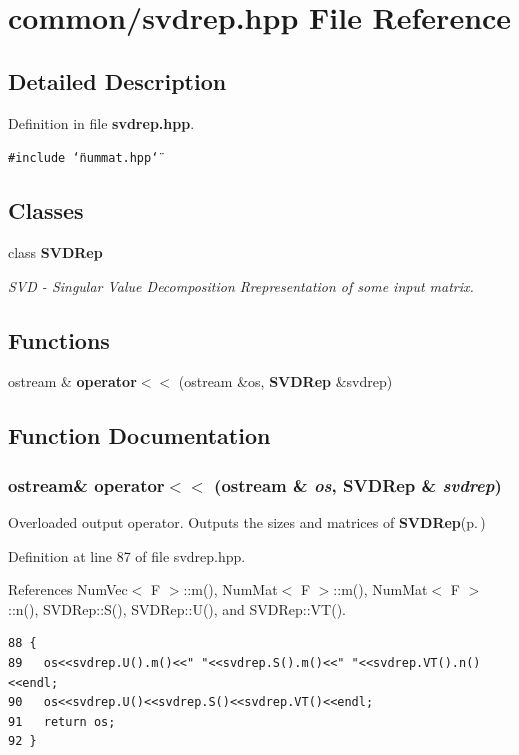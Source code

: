 \section{common/svdrep.hpp File Reference}
\label{svdrep_8hpp}


\subsection{Detailed Description}


Definition in file {\bf svdrep.hpp}.

{\tt \#include \char`\"{}nummat.hpp\char`\"{}}\par
\subsection*{Classes}
\begin{CompactItemize}
\item 
class {\bf SVDRep}
\begin{CompactList}\small\item\em SVD - Singular Value Decomposition Rrepresentation of some input matrix. \item\end{CompactList}\end{CompactItemize}
\subsection*{Functions}
\begin{CompactItemize}
\item 
ostream \& {\bf operator$<$$<$} (ostream \&os, {\bf SVDRep} \&svdrep)
\end{CompactItemize}


\subsection{Function Documentation}
\subsubsection{\setlength{\rightskip}{0pt plus 5cm}ostream\& operator$<$$<$ (ostream \& {\em os}, {\bf SVDRep} \& {\em svdrep})\hspace{0.3cm}{\tt  [inline]}}\label{svdrep_8hpp_bed1fbd2bbde8a74117d45ebe8d75c26_bed1fbd2bbde8a74117d45ebe8d75c26}


Overloaded output operator. Outputs the sizes and matrices of {\bf SVDRep}{\rm (p.\,\pageref{classSVDRep})} 

Definition at line 87 of file svdrep.hpp.

References Num\-Vec$<$ F $>$::m(), Num\-Mat$<$ F $>$::m(), Num\-Mat$<$ F $>$::n(), SVDRep::S(), SVDRep::U(), and SVDRep::VT().

\footnotesize\begin{verbatim}88 {
89   os<<svdrep.U().m()<<" "<<svdrep.S().m()<<" "<<svdrep.VT().n()<<endl;
90   os<<svdrep.U()<<svdrep.S()<<svdrep.VT()<<endl;
91   return os;
92 }
\end{verbatim}\normalsize 



